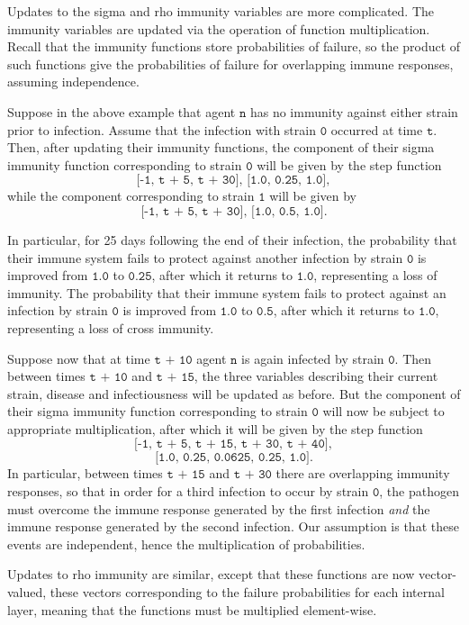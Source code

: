 \documentclass[10pt,letterpaper]{article}
\begin{document}
Updates to the sigma and rho immunity variables are more complicated. The immunity variables are updated via the operation of function multiplication. Recall that the immunity functions store probabilities of failure, so the product of such functions give the probabilities of failure for overlapping immune responses, assuming independence.

Suppose in the above example that agent $\texttt{n}$ has no immunity against either strain prior to infection. Assume that the infection with strain $\texttt{0}$ occurred at time $\texttt{t}$. Then, after updating their immunity functions, the component of their sigma immunity function corresponding to strain $\texttt{0}$ will be given by the step function $$\texttt{[-1, t + 5, t + 30], [1.0, 0.25, 1.0]},$$ while the component corresponding to strain $\texttt{1}$ will be given by $$\texttt{[-1, t + 5, t + 30], [1.0, 0.5, 1.0]}.$$

In particular, for 25 days following the end of their infection, the probability that their immune system fails to protect against another infection by strain $\texttt{0}$ is improved from $\texttt{1.0}$ to $\texttt{0.25}$, after which it returns to $\texttt{1.0}$, representing a loss of immunity. The probability that their immune system fails to protect against an infection by strain $\texttt{0}$ is improved from $\texttt{1.0}$ to $\texttt{0.5}$, after which it returns to $\texttt{1.0}$, representing a loss of cross immunity.

Suppose now that at time $\texttt{t + 10}$ agent $\texttt{n}$ is again infected by strain $\texttt{0}$. Then between times $\texttt{t + 10}$ and $\texttt{t + 15}$, the three variables describing their current strain, disease and infectiousness will be updated as before. But the component of their sigma immunity function corresponding to strain $\texttt{0}$ will now be subject to appropriate multiplication, after which it will be given by the step function $$\texttt{[-1, t + 5, t + 15, t + 30, t + 40]},$$ $$\texttt{[1.0, 0.25, 0.0625, 0.25, 1.0]}.$$ In particular, between times $\texttt{t + 15}$ and $\texttt{t + 30}$ there are overlapping immunity responses, so that in order for a third infection to occur by strain $\texttt{0}$, the pathogen must overcome the immune response generated by the first infection \textit{and} the immune response generated by the second infection. Our assumption is that these events are independent, hence the multiplication of probabilities.

Updates to rho immunity are similar, except that these functions are now vector-valued, these vectors corresponding to the failure probabilities for each internal layer, meaning that the functions must be multiplied element-wise.
\end{document}
